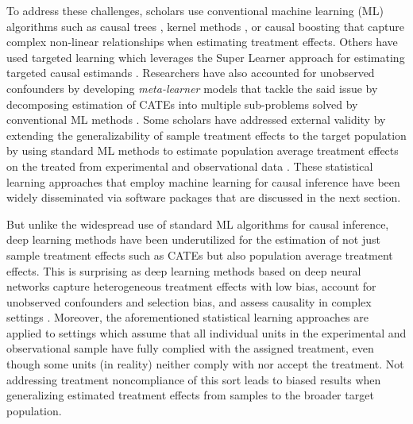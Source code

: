 To address these challenges, scholars use conventional machine learning
(ML) algorithms such as causal trees \citep{athey2016recursive}, kernel
methods \citep{alaa2018limits}, or causal boosting \citep{powers2018hte} that
capture complex non-linear relationships when estimating treatment
effects. Others have used targeted learning which leverages the Super
Learner approach for estimating targeted causal estimands
\citep{vanderlaan2011targeted, Schuler2017targetedMLE}. Researchers have
also accounted for unobserved confounders by developing \emph{meta-learner}
models that tackle the said issue by decomposing estimation of CATEs
into multiple sub-problems solved by conventional ML methods
\citep{Kunzel2019meta, nie2021quasi}. Some scholars have addressed external
validity by extending the generalizability of sample treatment effects
to the target population by using standard ML methods to estimate
population average treatment effects on the treated from experimental
and observational data \citep{Hartman2015PATE, balz2016targeted, Zhang2019estimating, ottoboni2020PATT}. These statistical learning
approaches that employ machine learning for causal inference have been
widely disseminated via software packages that are discussed in the next
section.

But unlike the widespread use of standard ML algorithms for causal
inference, deep learning methods have been underutilized for the
estimation
of not just sample treatment effects such as CATEs but also population
average treatment effects. This is surprising as deep learning methods
based on deep neural networks capture heterogeneous treatment effects
with low bias, account for unobserved confounders and selection bias,
and assess causality in complex settings \citep{Farrell2021DeepNeural, koch2024deepcausal}. Moreover, the aforementioned statistical learning
approaches are applied to settings which assume that all individual
units in the experimental and observational sample have fully complied
with the assigned treatment, even though some units (in reality) neither
comply with nor accept the treatment. Not addressing treatment
noncompliance of this sort leads to biased results when generalizing
estimated treatment effects from samples to the broader target
population.

